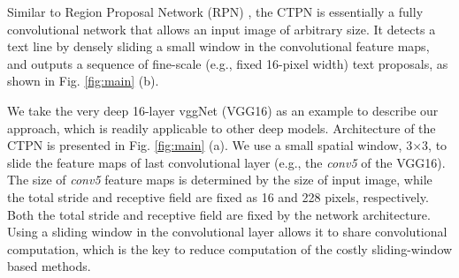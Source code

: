 \documentclass[runningheads]{llncs}
\begin{document}
Similar to Region Proposal Network (RPN) \cite{Ren2015}, the CTPN is essentially a fully convolutional network that allows an input image of arbitrary size. It detects a text line by densely sliding a small window in the convolutional feature maps, and outputs a sequence of fine-scale (e.g., fixed 16-pixel width) text proposals, as shown in Fig. \ref{fig:main} (b). 

We take the very deep 16-layer vggNet (VGG16) \cite{Simonyan2015} as an example to describe our approach, which is readily applicable to other deep models. Architecture of the CTPN is presented in Fig. \ref{fig:main} (a). We use a small spatial window, 3$\times$3, to slide the feature maps of last convolutional layer (e.g., the \textit{conv5} of the VGG16). The size of \textit{conv5} feature maps is determined by the size of input image, while the total stride and receptive field are fixed as 16 and 228 pixels, respectively.
Both the total stride and receptive field are fixed by the network architecture. 
Using a sliding window in the convolutional layer allows it to share convolutional computation, which is the key to reduce  computation of the costly sliding-window based methods.  

\end{document}

